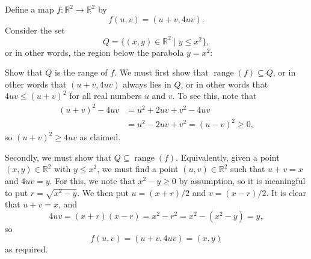 \documentclass[a4paper]{book}
\newcommand{\R}         {{\mathbb{R}}}
\newcommand{\sse}       {\subseteq}
\newcommand{\st}        {\;|\;}
\newcommand{\xra}       {\xrightarrow}
\newcommand{\range}     {\operatorname{range}}
\renewcommand{\:}{\colon}
\theoremstyle{definition}
\newenvironment{sstarex}{
 \renewcommand{\thetheorem}{\arabic{chapter}.\arabic{section}.\arabic{theorem}${}^{**}$}
 \exercise
}{\endexercise}
\renewenvironment{solution}{\SolutionInline}{\endSolutionInline}
\begin{document}
\begin{sstarex}
 Define a map $f\:\R^2\xra{}\R^2$ by
 \[ f(u,v) = (u+v,4uv). \]
 Consider the set
 \[ Q = \{(x,y)\in\R^2\st y \leq x^2\}, \]
 or in other words, the region below the parabola $y=x^2$:
 \begin{center}
 \end{center}
 Show that $Q$ is the range of $f$.
\end{sstarex}
\begin{solution}
 We must first show that $\range(f)\sse Q$, or in other words that
 $(u+v,4uv)$ always lies in $Q$, or in other words that
 $4uv\leq(u+v)^2$ for all real numbers $u$ and $v$.  To see this,
 note that
 \begin{align*}
  (u+v)^2 - 4uv &= u^2 + 2uv + v^2 - 4uv \\
                &= u^2 - 2uv + v^2 = (u-v)^2 \geq 0,
 \end{align*}
 so $(u+v)^2\geq 4uv$ as claimed.

 Secondly, we must show that $Q\sse\range(f)$.  Equivalently, given a
 point $(x,y)\in\R^2$ with $y\leq x^2$, we must find a point
 $(u,v)\in\R^2$ such that $u+v=x$ and $4uv=y$.  For this, we note that
 $x^2-y\geq 0$ by assumption, so it is meaningful to put
 $r=\sqrt{x^2-y}$.  We then put $u=(x+r)/2$ and $v=(x-r)/2$.  It is
 clear that $u+v=x$, and
 \[ 4uv = (x+r)(x-r) = x^2 - r^2 = x^2 - (x^2 - y) = y, \]
 so
 \[ f(u,v) = (u+v,4uv) = (x,y) \]
 as required.
\end{solution}
\end{document}

